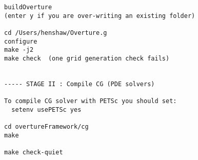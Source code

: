 \begin{Verbatim}[fontsize=\footnotesize]
buildOverture
(enter y if you are over-writing an existing folder)

cd /Users/henshaw/Overture.g
configure 
make -j2
make check  (one grid generation check fails)


----- STAGE II : Compile CG (PDE solvers)

To compile CG solver with PETSc you should set: 
  setenv usePETSc yes

cd overtureFramework/cg
make

make check-quiet




\end{Verbatim}
















